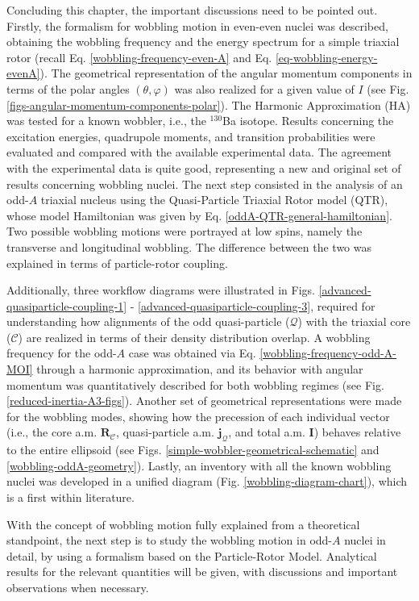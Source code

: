 Concluding this chapter, the important discussions need to be pointed out. Firstly, the formalism for wobbling motion in even-even nuclei was described, obtaining the wobbling frequency and the energy spectrum for a simple triaxial rotor (recall Eq. \ref{wobbling-frequency-even-A} and Eq. \ref{eq-wobbling-energy-evenA}). The geometrical representation of the angular momentum components in terms of the polar angles $(\theta,\varphi)$ was also realized for a given value of $I$ (see Fig. \ref{figs-angular-momentum-components-polar}). The Harmonic Approximation (HA) was tested for a known wobbler, i.e., the $^{130}$Ba isotope. Results concerning the excitation energies, quadrupole moments, and transition probabilities were evaluated and compared with the available experimental data. The agreement with the experimental data is quite good, representing a new and original set of results concerning wobbling nuclei. The next step consisted in the analysis of an odd-$A$ triaxial nucleus using the Quasi-Particle Triaxial Rotor model (QTR), whose model Hamiltonian was given by Eq. \ref{oddA-QTR-general-hamiltonian}. Two possible wobbling motions were portrayed at low spins, namely the transverse and longitudinal wobbling. The difference between the two was explained in terms of particle-rotor coupling. 

Additionally, three workflow diagrams were illustrated in Figs. \ref{advanced-quasiparticle-coupling-1} - \ref{advanced-quasiparticle-coupling-3}, required for understanding how alignments of the odd quasi-particle ($\mathcal{Q}$) with the triaxial core ($\mathscr{C}$) are realized in terms of their density distribution overlap. A wobbling frequency for the odd-$A$ case was obtained via Eq. \ref{wobbling-frequency-odd-A-MOI} through a harmonic approximation, and its behavior with angular momentum was quantitatively described for both wobbling regimes (see Fig. \ref{reduced-inertia-A3-figs}). Another set of geometrical representations were made for the wobbling modes, showing how the precession of each individual vector (i.e., the core a.m. $\mathbf{R}_\mathscr{C}$, quasi-particle a.m. $\mathbf{j}_\mathcal{Q}$, and total a.m. $\mathbf{I}$) behaves relative to the entire ellipsoid (see Figs. \ref{simple-wobbler-geometrical-schematic} and \ref{wobbling-oddA-geometry}). Lastly, an inventory with all the known wobbling nuclei was developed in a unified diagram (Fig. \ref{wobbling-diagram-chart}), which is a first within literature.

With the concept of wobbling motion fully explained from a theoretical standpoint, the next step is to study the wobbling motion in odd-$A$ nuclei in detail, by using a formalism based on the Particle-Rotor Model. Analytical results for the relevant quantities will be given, with discussions and important observations when necessary.